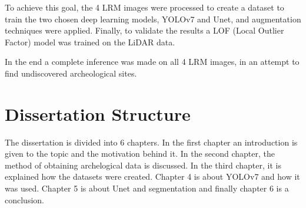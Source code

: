 To achieve this goal, the 4 LRM images were processed to create a dataset to train the two chosen deep learning models, YOLOv7 and Unet, and augmentation techniques were applied. Finally, to validate the results a LOF (Local Outlier Factor) model was trained on the LiDAR data.

In the end a complete inference was made on all 4 LRM images, in an attempt to find undiscovered archeological sites.

\section{Dissertation Structure}
The dissertation is divided into 6 chapters. In the first chapter an introduction is given to the topic and the motivation behind it. In the second chapter, the method of obtaining archelogical data is discussed. In the third chapter, it is explained how the datasets were created. Chapter 4 is about YOLOv7 and how it was used. Chapter 5 is about Unet and segmentation and finally chapter 6 is a conclusion.

